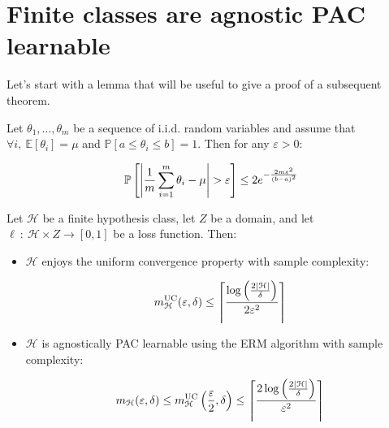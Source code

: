 \documentclass[../../main/main.tex]{subfiles}
\begin{document}
\section{Finite classes are agnostic PAC learnable}
Let's start with a lemma that will be useful to give a proof of a subsequent theorem.

\begin{lemma}
    \label{lem:C3_HI}
    Let \( \theta_1, \dots, \theta_m \) be a sequence of i.i.d. random variables and assume that \( \forall i, \ \mathbb{E}[\theta_i] = \mu \) and \( \mathbb{P}[a \le \theta_i \le b] = 1 \). Then for any \( \varepsilon > 0 \):

    \begin{equation}
        \mathbb{P} \left[ \abs{\frac{1}{m} \sum_{i=1}^{m} \theta_i - \mu } > \varepsilon \right]
        \le
        2 e^{- \frac{2m \varepsilon^2}{(b-a)^2}}
        \label{eq:C3_HI}
    \end{equation}
\end{lemma}

\begin{theorem}
    Let \( \mathcal{H} \) be a finite hypothesis class, let \( Z \) be a domain, and let \( \ell \ : \ \mathcal{H} \times Z \to [0,1] \) be a loss function.
    Then:
    \begin{itemize}
        \item \( \mathcal{H} \) enjoys the uniform convergence property with sample complexity:

            \begin{equation}
                m_{\mathcal{H}}^{\text{UC}}(\varepsilon, \delta)
                \le
                \left \lceil \frac{\log{\left(\frac{2 \abs{\mathcal{H}}}{\delta}\right)}}{2 \varepsilon^2} \right \rceil
                \label{eq:C3_UCSC}
            \end{equation}

        \item \( \mathcal{H} \) is agnostically PAC learnable using the ERM algorithm with sample complexity:

            \begin{equation}
                m_{\mathcal{H}}(\varepsilon, \delta)
                \le
                m_{\mathcal{H}}^{\text{UC}}\left(\frac{\varepsilon}{2},\delta \right)
                \le
                \left \lceil \frac{2 \log{\left(\frac{2 \abs{\mathcal{H}}}{\delta}\right)}}{\varepsilon^2} \right \rceil
                \label{eq:C3_ALSC}
            \end{equation}
    \end{itemize}
\end{theorem}
\end{document}
